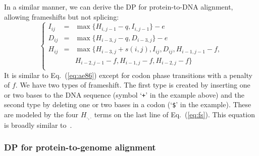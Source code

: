 \documentclass{bioinfo}
\begin{document}
\begin{methods}
In a similar manner, we can derive the DP for protein-to-DNA alignment,
allowing frameshifts but not splicing:
\begin{equation}\label{eq:fs}
\left\{\begin{array}{lll}
I_{ij}&=&\max\{ H_{i,j-1} - q, I_{i,j-1} \} - e \\
D_{ij}&=&\max\{ H_{i-3,j} - q, D_{i-3,j} \} - e \\
H_{ij}&=&\max\{ H_{i-3,j}+s(i,j), I_{ij}, D_{ij}, H_{i-1,j-1}-f, \\
       && H_{i-2,j-1}-f, H_{i-1,j}-f, H_{i-2,j}-f \} \\
\end{array}\right.
\end{equation}
It is similar to Eq.~(\ref{eq:ae86}) except for codon phase transitions with a
penalty of $f$. We have two types of frameshift. The first type is created by
inserting one or two bases to the DNA sequence (symbol `{\tt +}' in the example
above) and the second type by deleting one or two bases in a codon (`{\tt \$}'
in the example). These are modeled by the four $H_{\cdot,\cdot}$ terms on the
last line of Eq.~(\ref{eq:fs}).  This equation is broadly similar
to~\citet{Zhang:1997tq}.

\subsubsection{DP for protein-to-genome alignment}


\end{methods}
\end{document}
